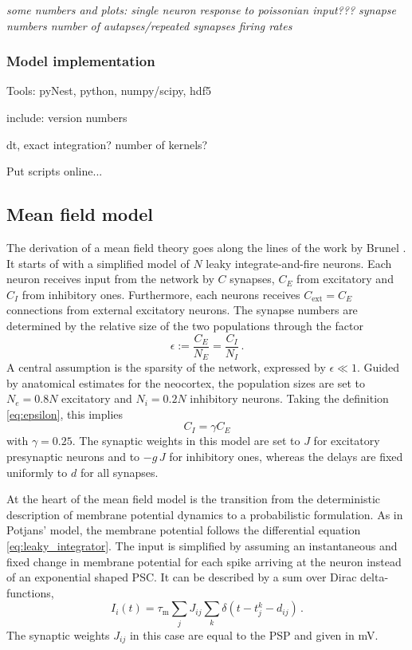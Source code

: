 \emph{some numbers and plots: 
single neuron response to poissonian input???
synapse numbers
number of autapses/repeated synapses
firing rates}

\subsubsection{Model implementation}
Tools: pyNest, python, numpy/scipy, hdf5

include: version numbers

dt, exact integration?
number of kernels?

Put scripts online...


\subsection{Mean field model}
The derivation of a mean field theory goes along the 
lines of the work by Brunel \cite{brunel2000}.
It starts of with a simplified model of 
$N$ leaky integrate-and-fire neurons. 
Each neuron receives input from the network by $C$ synapses, 
$C_E$ from excitatory and $C_I$ from inhibitory ones. 
Furthermore, each neurons receives $C_\text{ext} = C_E$ connections from 
external excitatory neurons.
The synapse numbers 
are determined by the relative size of the two populations through the factor
\begin{equation}
    \epsilon := \frac{C_E}{N_E} = \frac{C_I}{N_I} \,.
    \label{eq:epsilon}
\end{equation}
A central assumption is the sparsity of the network, expressed by $\epsilon \ll 1$.
Guided by anatomical estimates for the neocortex, the population sizes are set to
$N_e = 0.8N$ excitatory and $N_i = 0.2N$ inhibitory neurons. Taking the definition
\eqref{eq:epsilon}, this implies 
\begin{equation}
    C_I = \gamma C_E 	
 \label{eq:C_I}
\end{equation}
with $\gamma = 0.25$. The synaptic weights in this model are set to $J$ for 
excitatory presynaptic neurons and to $-g\, J$ for inhibitory ones, 
whereas the delays are fixed uniformly to $d$ for all synapses. 

At the heart of the mean field model
is the transition from the deterministic description of membrane potential 
dynamics to a probabilistic formulation. 
As in Potjans' model, the membrane potential follows
the differential equation \eqref{eq:leaky_integrator}. The input is simplified 
by assuming an instantaneous and fixed change in membrane potential
for each spike arriving at the neuron instead of an exponential shaped PSC.
It can be described by a sum over Dirac delta-functions, 
\begin{equation}
    I_i(t) = \tau_\text{m} \sum_j J_{ij} \sum_k \delta(t - t_j^k - d_{ij}) \,.
    \label{eq:input_const_volt}
\end{equation}
The synaptic weights $J_{ij}$ in this case are equal to the PSP and given in mV.  

